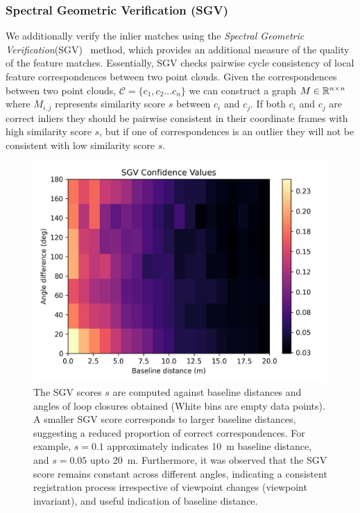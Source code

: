 \subsubsection*{\textbf{Spectral Geometric Verification (SGV)}}
We additionally verify the inlier matches using the \emph{Spectral Geometric Verification}(SGV)~\cite{vidanapathirana2023ral} method, which provides an additional measure of the quality of the feature matches. Essentially, SGV checks pairwise cycle consistency of local feature correspondences between two point clouds. Given the correspondences between two point clouds, $\mathcal{C}=\{c_1, c_2 \ldots c_n\}$ we can construct a graph $M \in \mathbb{R}^{n \times n}$ where $M_{i,j}$ represents similarity score $s$ between $c_i$ and $c_j$. If both $c_i$ and $c_j$ are correct inliers they should be pairwise consistent in their coordinate frames with high similarity score $s$, but if one of correspondences is an outlier they will not be consistent with low similarity score $s$. 
\begin{figure}[t]
  \centering
  \includegraphics*[width=0.9\columnwidth]{pics/methods_svg_distance2.png}
  \caption{The SGV scores $s$ are computed against baseline distances and angles of loop closures obtained (White bins are empty data points). A smaller SGV score corresponds to larger baseline distances, suggesting a reduced proportion of correct correspondences. 
  For example, $s=0.1$ approximately indicates \SI{10}{\meter} baseline distance, and $s=0.05$ upto \SI{20}{\meter}. Furthermore, it was observed that the SGV score remains constant across different angles, indicating a consistent registration process irrespective of viewpoint changes (viewpoint invariant), and useful indication of baseline distance.}
  \label{fig:sgv_distance}
\end{figure}
